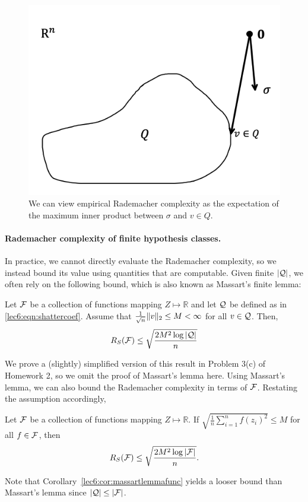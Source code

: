 \begin{figure}[ht!]
	\begin{center}
		\includegraphics[width=.5\textwidth]{figures/remark2.png}
	\end{center}
	\caption{We can view empirical Rademacher complexity as the expectation of the maximum inner product between $\sigma$ and $v\in Q$.}
	\label{lec6:fig:rs-innerprod}
\end{figure}

\paragraph{Rademacher complexity of finite hypothesis classes.} In practice, we cannot directly evaluate the Rademacher complexity, so we instead bound its value using quantities that are computable. Given finite $|\mathcal Q|$, we often rely on the following bound, which is also known as Massart's finite lemma: 
\begin{proposition}
    Let $\mathcal F$ be a collection of functions mapping $Z \mapsto \mathbb{R}$ and let $\mathcal Q$ be defined as in \eqref{lec6:eqn:shattercoef}. Assume that $\frac{1}{\sqrt{n}} \|v\|_2 \le M < \infty$ for all $v \in \mathcal Q$. Then,
    \begin{align}
        R_S(\mathcal F) \leq \sqrt{\frac{2 M^2 \log |\mathcal Q|}{n}}
    \end{align}
    \label{lec6:prop:massartlemma}
\end{proposition}
We prove a (slightly) simplified version of this result in Problem 3(c) of Homework 2, so we omit the proof of Massart's lemma here. Using Massart's lemma, we can also bound the Rademacher complexity in terms of $\mathcal F$. Restating the assumption accordingly, 

\begin{corollary}
    Let $\mathcal F$ be a collection of functions mapping $Z \mapsto \mathbb{R}$. If $\sqrt{\frac{1}{n}\sum_{i=1}^n f(z_i)^2} \le M$ for all $f \in \mathcal F$, then 
    \begin{align}
        R_S(\mathcal F) \le \sqrt{\frac{2M^2\log \left\lvert\mathcal F\right\rvert}{n}}.
    \end{align}
    \label{lec6:cor:massartlemmafunc}
\end{corollary}
Note that Corollary~\ref{lec6:cor:massartlemmafunc} yields a looser bound than Massart's lemma since $|\mathcal Q| \leq |\mathcal F|$. 
    
